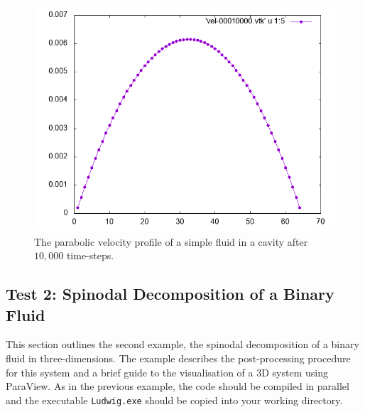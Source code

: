 \documentclass[11pt,twoside,a4paper]{article}
\begin{document}
\begin{figure}[h]
\begin{center}
\includegraphics[width=0.8\linewidth]{velProf.png}
  \caption{The parabolic velocity profile of a simple fluid in a cavity after $10,000$ time-steps.}
  \label{fig:velocityProfile}
  \end{center}
\end{figure}

\subsection{Test 2: Spinodal Decomposition of a Binary Fluid}

This section outlines the second example, the spinodal decomposition of a binary fluid in 
three-dimensions.
The example describes the post-processing procedure for this system and a brief guide to 
the visualisation of a 3D system using ParaView.
As in the previous example, the code should be compiled in parallel and the executable 
\texttt{Ludwig.exe} should be copied into your working directory.
\end{document}
